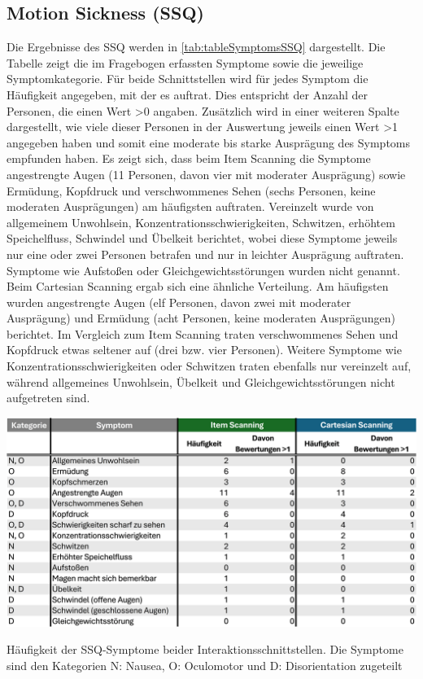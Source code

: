 \subsection{Motion Sickness (SSQ)} 

Die Ergebnisse des SSQ werden in \autoref{tab:tableSymptomsSSQ} dargestellt. Die Tabelle zeigt die im Fragebogen erfassten Symptome sowie die jeweilige Symptomkategorie. Für beide Schnittstellen wird für jedes Symptom die Häufigkeit angegeben, mit der es auftrat. Dies entspricht der Anzahl der Personen, die einen Wert >0 angaben. Zusätzlich wird in einer weiteren Spalte dargestellt, wie viele dieser Personen in der Auswertung jeweils einen Wert >1 angegeben haben und somit eine moderate bis starke Ausprägung des Symptoms empfunden haben. 
Es zeigt sich, dass beim Item Scanning die Symptome angestrengte Augen (11 Personen, davon vier mit moderater Ausprägung) sowie Ermüdung, Kopfdruck und verschwommenes Sehen (sechs Personen, keine moderaten Ausprägungen) am häufigsten auftraten. Vereinzelt wurde von allgemeinem Unwohlsein, Konzentrationsschwierigkeiten, Schwitzen, erhöhtem Speichelfluss, Schwindel und Übelkeit berichtet, wobei diese Symptome jeweils nur eine oder zwei Personen betrafen und nur in leichter Ausprägung auftraten. Symptome wie Aufstoßen oder Gleichgewichtsstörungen wurden nicht genannt.
Beim Cartesian Scanning ergab sich eine ähnliche Verteilung. Am häufigsten wurden angestrengte Augen (elf Personen, davon zwei mit moderater Ausprägung) und Ermüdung (acht Personen, keine moderaten Ausprägungen) berichtet. Im Vergleich zum Item Scanning traten verschwommenes Sehen und Kopfdruck etwas seltener auf (drei bzw. vier Personen). Weitere Symptome wie Konzentrationsschwierigkeiten oder Schwitzen traten ebenfalls nur vereinzelt auf, während allgemeines Unwohlsein, Übelkeit und Gleichgewichtsstörungen nicht aufgetreten sind.

\begin{table}[tbh]
    \centering
    \includegraphics[width=1.0\textwidth]{images/Results/SSQ-Table-2.png}
    \caption{Häufigkeit der SSQ-Symptome beider Interaktionsschnittstellen. Die Symptome sind den Kategorien N: Nausea, O: Oculomotor und D: Disorientation zugeteilt}
    \label{tab:tableSymptomsSSQ}
\end{table}

